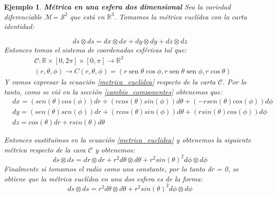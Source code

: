 \documentclass[pdftex,11pt,a4paper]{book}
\newtheorem{ejem}{Ejemplo}
\newcommand{\M}{$\mathscr{M}$}
\begin{document}
\begin{ejem}
\textbf{Métrica en una esfera dos dimensional} Sea la variedad diferenciable \M= $\mathcal{S}^2$ que está en $\mathds{R}^3$.  Tomamos la métrica euclídea con la carta identidad: 

\begin{equation}
    ds\otimes ds = dx \otimes dx + dy \otimes dy + dz \otimes dz
    \label{metrica_euclidea}
\end{equation}
 Entonces tomos el sistema de coordenadas esféricas tal que: 
\begin{equation}
\begin{array}{cc}
&\mathscr{C}:\mathds{R}\times [0,2\pi]\times[0, \pi] \to \mathds{R}^3\\
&(r, \theta, \phi) \to C(r,\theta,\phi)= (r \operatorname{sen} \theta \cos\phi, r\operatorname{sen} \theta \operatorname{sen} \phi, r \cos \theta )

\end{array}
\end{equation}
Y vamos expresar la ecuación \ref{metrica_euclidea} respecto de la carta $\mathscr{C}$. Por lo tanto, como se vió en la sección \ref{cambio_componentes} obtenemos que: 
\begin{equation}
    \begin{array}{cc}
         & dx =(sen(\theta)cos(\phi))dr + (r cos(\theta)sin(\phi) ) d\theta + (-rsen(\theta)cos(\phi))d\phi  \\
         & dy= (sen(\theta)sen(\phi))dr +(rcos(\theta)sin(\phi))  d \theta + (rsin(\theta)cos(\phi))d \phi\\
         & dz = cos(\theta) dr + r sin(\theta) d\theta
         
    \end{array}
\end{equation}

Entonces sustituimos en la ecuación \ref{metrica_euclidea} y obtenemos la siguiente métrica respecto de la cara $\mathscr{C}$ y obtenemos: 
\begin{equation}
    ds\otimes ds =  dr\otimes dr + r^2 d\theta \otimes d\theta + r^2 sin(\theta)^2d\phi \otimes d\phi
    \label{metrica_coor_esferica}
\end{equation}
Finalmente si tomamos el radio como una constante, por lo tanto dr = 0, se obtiene que la métrica euclídea en una dos esfera es de la forma: 
\begin{equation}
    ds\otimes ds =  r^2 d\theta \otimes d\theta + r^2 sin(\theta)^2d\phi \otimes d\phi
    \label{metrica_esferica}
\end{equation}

\end{ejem}
\end{document}

